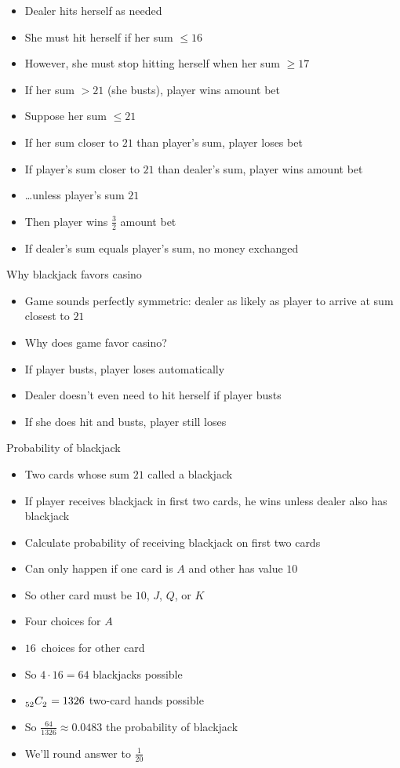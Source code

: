 \documentclass{beamer}
\theoremstyle{definition}
\newcommand\ncr[2]{\tensor[_{#1}]C{_{#2}}}
\begin{document}
\begin{frame}
\begin{itemize}
\item Dealer hits herself as needed
\item She \alert{must} hit herself if her sum $\le 16$
\item However, she must stop hitting herself when her sum $\ge 17$
\item If her sum $>21$ (she \alert{busts}), player wins amount bet
\item Suppose her sum $\le 21$
\item If her sum closer to $21$ than player's sum,
player loses bet
\item If player's sum closer to $21$ than dealer's sum,
player wins amount bet
\item \dots unless player's sum $21$
\item Then player wins $\frac{3}{2}$ amount bet
\item If dealer's sum equals player's sum, no money exchanged
\end{itemize}
\end{frame}

\begin{frame}{Why blackjack favors casino}
\begin{itemize}
\item Game sounds perfectly symmetric: dealer as likely
as player to arrive at sum closest to $21$
\item Why does game favor casino?
\item If player busts, player loses automatically
\item Dealer doesn't even need to hit herself if player busts
\item If she does hit and busts, player still loses
\end{itemize}
\end{frame}

\begin{frame}{Probability of blackjack}
\begin{itemize}
\item Two cards whose sum $21$ called a \alert{blackjack}
\item If player receives blackjack in first two cards,
he wins unless dealer also has blackjack
\item Calculate probability of receiving blackjack on first two cards
\item Can only happen if one card is $A$ and other
has value $10$
\item So other card must be $10$, $J$, $Q$, or $K$
\item Four choices for $A$
\item $16$~choices for other card
\item So $4\cdot 16=64$ blackjacks possible
\item $\ncr{52}{2}=1326$ two-card hands possible 
\item So $\frac{64}{1326}\approx 0.0483$ the probability of blackjack
\item We'll round answer to $\frac{1}{20}$
\end{itemize}
\end{frame}
\end{document}
